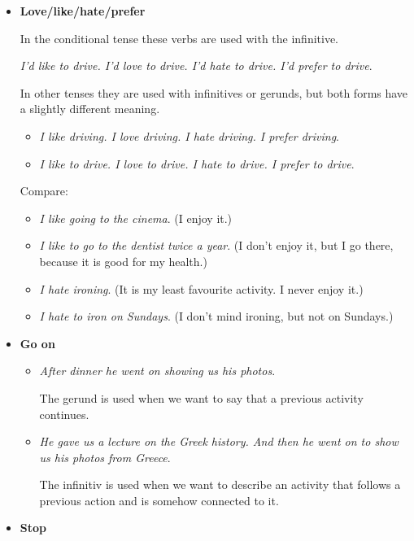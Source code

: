 \begin{itemize}
\begin{itemize}
\begin{itemize}
\item \textbf{Love/like/hate/prefer}

In the conditional tense these verbs are used with the infinitive.

\textit{I'd like to drive. I'd love to drive. I'd hate to drive. I'd prefer to drive}.

In other tenses they are used with infinitives or gerunds, but both forms have a slightly different meaning.

\begin{itemize}

\item \textit{I like driving. I love driving. I hate driving. I prefer driving}.
\item \textit{I like to drive. I love to drive. I hate to drive. I prefer to drive}.
\end{itemize}

Compare:

\begin{itemize}
\item \textit{I like going to the cinema}. (I enjoy it.) 
\item \textit{I like to go to the dentist twice a year}. (I don't enjoy it, but I go there, because it is good for my health.) 
\item \textit{I hate ironing}. (It is my least favourite activity. I never enjoy it.) 
\item \textit{I hate to iron on Sundays}. (I don't mind ironing, but not on Sundays.) 

\end{itemize}

\item \textbf{Go on}

\begin{itemize}
\item \textit{After dinner he went on showing us his photos}.

The gerund is used when we want to say that a previous activity continues.

\item \textit{He gave us a lecture on the Greek history. And then he went on to show us his photos from Greece}.

The infinitiv is used when we want to describe an activity that follows a previous action and is somehow connected to it.

\end{itemize}

\item \textbf{Stop}


\end{itemize}
\end{itemize}
\end{itemize}
